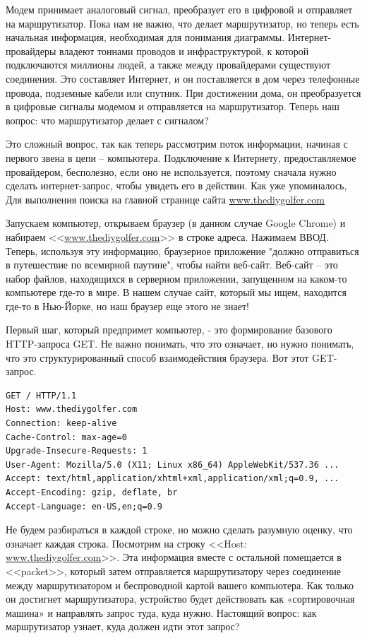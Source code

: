 \documentclass[12pt]{article}
\begin{document}
Модем принимает аналоговый сигнал, преобразует его в цифровой и
отправляет на маршрутизатор. Пока нам не важно, что делает
маршрутизатор, но теперь есть начальная информация, необходимая для
понимания диаграммы. Интернет-провайдеры владеют тоннами проводов и
инфраструктурой, к которой подключаются миллионы людей, а также между
провайдерами существуют соединения. Это составляет Интернет, и он
поставляется в дом через телефонные провода, подземные кабели или
спутник. При достижении дома, он преобразуется в цифровые сигналы модемом
и отправляется на маршрутизатор. Теперь наш вопрос: что маршрутизатор
делает с сигналом?

Это сложный вопрос, так как теперь рассмотрим поток информации, начиная
с первого звена в цепи -- компьютера. Подключение к Интернету,
предоставляемое провайдером, бесполезно, если оно не используется,
поэтому сначала нужно сделать интернет-запрос, чтобы увидеть его в
действии. Как уже упоминалось, Для выполнения поиска на главной странице
сайта \href{http://www.thediygolfer.com}{www.thediygolfer.com}

Запускаем компьютер, открываем браузер (в данном случае Google Chrome) и
набираем <<\href{http://www.thediygolfer.com}{www.thediygolfer.com}>> в
строке адреса. Нажимаем ВВОД. Теперь, используя эту информацию,
браузерное приложение "должно отправиться в путешествие по всемирной
паутине", чтобы найти веб-сайт. Веб-сайт -- это набор файлов, находящихся
в серверном приложении, запущенном на каком-то компьютере где-то в мире.
В нашем случае сайт, который мы ищем, находится где-то в Нью-Йорке, но
наш браузер еще этого не знает!

Первый шаг, который предпримет компьютер, - это формирование базового
HTTP-запроса GET. Не важно понимать, что это означает, но нужно
понимать, что это структурированный способ взаимодействия браузера. Вот
этот GET-запрос.

\begin{verbatim}
GET / HTTP/1.1
Host: www.thediygolfer.com
Connection: keep-alive
Cache-Control: max-age=0
Upgrade-Insecure-Requests: 1
User-Agent: Mozilla/5.0 (X11; Linux x86_64) AppleWebKit/537.36 ...
Accept: text/html,application/xhtml+xml,application/xml;q=0.9, ...
Accept-Encoding: gzip, deflate, br
Accept-Language: en-US,en;q=0.9
\end{verbatim}

Не будем разбираться в каждой строке, но можно сделать разумную оценку,
что означает каждая строка. Посмотрим на строку <<Host:
\href{http://www.thediygolfer.com}{www.thediygolfer.com}>>. Эта
информация вместе с остальной помещается в <<packet>>, который затем
отправляется маршрутизатору через соединение между маршрутизатором и
беспроводной картой вашего компьютера. Как только он достигнет
маршрутизатора, устройство будет действовать как «сортировочная машина»
и направлять запрос туда, куда нужно. Настоящий вопрос: как
маршрутизатор узнает, куда должен идти этот запрос?
\end{document}
